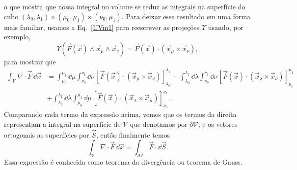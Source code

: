 o que mostra que nossa integral no volume se reduz as integrais na superfície do
cubo $(\lambda_0,\lambda_1)\times(\mu_0,\mu_1)\times(\nu_0,\mu_1)$. Para deixar
esse resultado em uma forma mais familiar, usamos a Eq.~\eqref{UVm1} para
reescrever as projeções $\Upsilon$ usando, por exemplo,
$$\Upsilon\left(\vec{F}\left(\vec{x}\right)\wedge\vec{x}_\mu\wedge\vec{x}_\nu\right) = \vec{F}\left(\vec{x}\right)\cdot\left(\vec{x}_\mu\times\vec{x}_\nu\right),$$
para mostrar que
\begin{equation}\label{pregauss}
	\begin{split}
		\int_{\mathcal{V}}\nabla\cdot\vec{F}\, \dd \vec{x} & = \int_{\mu_0}^{\mu_1}\dd \mu\int_{\nu_0}^{\nu_1}\dd \nu\,
		\left[\vec{F}\left(\vec{x}\right)\cdot\left(\vec{x}_\mu\times\vec{x}_\nu\right)\right]_{\lambda_0}^{\lambda_1}
		-\int_{\lambda_0}^{\lambda_1}\dd \lambda\int_{\nu_0}^{\nu_1}\dd \nu\,
		\left[\vec{F}\left(\vec{x}\right)\cdot\left(\vec{x}_\lambda\times\vec{x}_\nu\right)\right]_{\mu_0}^{\mu_1}                                                                                                                             \\
		                                                   & +\int_{\lambda_0}^{\lambda_1}\dd \lambda\int_{\mu_0}^{\mu_1}\dd \mu\, \left[\vec{F}\left(\vec{x}\right)\cdot\left(\vec{x}_\lambda\times\vec{x}_\mu\right)\right]_{\nu_0}^{\nu_1},
	\end{split}
\end{equation}
Comparando cada termo da expressão acima, vemos que os termos da direita
representam a integral na superfície de $\mathcal{V}$ que denotamos por
$\partial\mathcal{V}$, e os vetores ortogonais as superfícies por $\vec{S}$,
então finalmente temos
\begin{equation}
	\int_{\mathcal{V}}\nabla\cdot\vec{F}\, \dd \vec{x} = \int_{\partial\mathcal{V}}\vec{F}\cdot \dd \vec{S}.
\end{equation}
Essa expressão é conhecida como teorema da divergência ou teorema de Gauss.

